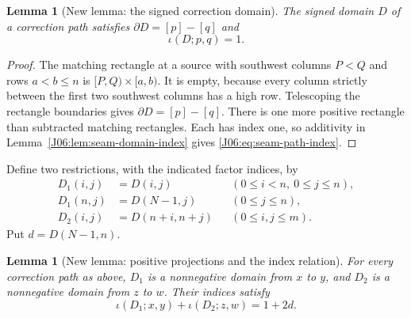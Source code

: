 \documentclass[11pt,oneside]{report}
\newtheorem{lemma}[theorem]{Lemma}
\theoremstyle{definition}
\numberwithin{equation}{section}
\begin{document}
\begin{lemma}[New lemma: the signed correction domain]
\label{J06:lem:seam-signed-domain}
The signed domain $D$ of a correction path satisfies
$\partial D=[p]-[q]$ and
\begin{equation}\label{J06:eq:seam-path-index}
 \iota(D;p,q)=1.
\end{equation}
\end{lemma}
\begin{proof}
The matching rectangle at a source with southwest columns $P<Q$ and
rows $a<b\le n$ is $[P,Q)\times[a,b)$. It is empty, because every
column strictly between the first two southwest columns has a high row.
Telescoping the rectangle boundaries gives $\partial D=[p]-[q]$.
There is one more positive rectangle than subtracted matching rectangles.
Each has index one, so additivity in Lemma~\ref{J06:lem:seam-domain-index}
gives \eqref{J06:eq:seam-path-index}.
\end{proof}

Define two restrictions, with the indicated factor indices, by
\begin{equation}\label{J06:eq:seam-domain-projections}
 \begin{aligned}
 D_1(i,j)&=D(i,j) &&(0\le i<n,\ 0\le j\le n),\\
 D_1(n,j)&=D(N-1,j) &&(0\le j\le n),\\
 D_2(i,j)&=D(n+i,n+j) &&(0\le i,j\le m).
 \end{aligned}
\end{equation}
Put $d=D(N-1,n)$.

\begin{lemma}[New lemma: positive projections and the index relation]
\label{J06:lem:seam-positive-projections}
For every correction path as above, $D_1$ is a nonnegative domain from
$x$ to $y$, and $D_2$ is a nonnegative domain from $z$ to $w$.
Their indices satisfy
\begin{equation}\label{J06:eq:seam-projected-index}
 \iota(D_1;x,y)+\iota(D_2;z,w)=1+2d.
\end{equation}
\end{lemma}
\end{document}
